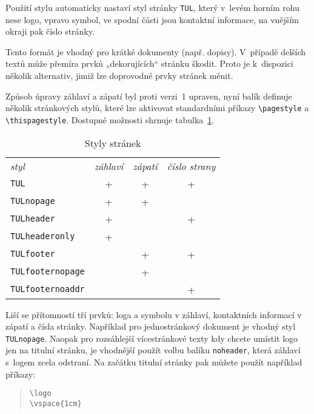 \documentclass[a4paper,12pt,twoside,FP]{article}
\newcommand{\cmdfont}[1]{\texttt{\color{\tulcolor}#1}}
\newcommand{\cmdnoindex}[1]{\cmdfont{\textbackslash #1}}
\begin{document}
Použití stylu automaticky nastaví styl stránky \cmdfont{TUL}, který v~levém
horním rohu nese logo, vpravo symbol, ve spodní části jsou kontaktní informace,
na vnějším okraji pak číslo stránky.

Tento formát je vhodný pro krátké dokumenty (např. dopisy). V~případě delších
textů může přemíra prvků „dekorujících“ stránku škodit. Proto je k~dispozici
několik alternativ, jimiž lze doprovodné prvky stránek měnit.

Způsob úpravy záhlaví a zápatí byl proti verzi~1 upraven, nyní balík definuje
několik stránkových stylů, které lze aktivovat standardními příkazy
\cmdfont{\textbackslash pagestyle} a \cmdfont{\textbackslash thispagestyle}.
Dostupné možnosti shrnuje tabulka~\ref{styly-stranek}.

\begin{table}[htp]
\begin{center}
\newcommand{\ano}{\mbox{}\qquad +\qquad\mbox{}}
\begin{tabular}{l@{}c@{}c@{}c}
\emph{styl} & \emph{záhlaví} & \emph{zápatí} & \emph{číslo strany} \\
\cmdfont{TUL}             & \ano & \ano & \ano \\
\cmdfont{TULnopage}       & \ano & \ano &   \\
\cmdfont{TULheader}       & \ano &   & \ano \\
\cmdfont{TULheaderonly}   & \ano &   &   \\
\cmdfont{TULfooter}       &   & \ano & \ano \\
\cmdfont{TULfooternopage} &   & \ano &   \\
\cmdfont{TULfooternoaddr} &   &   & \ano \\
\end{tabular}
\end{center}
\caption{Styly stránek}
\label{styly-stranek}
\end{table}

Liší se přítomností tří prvků: loga a symbolu v záhlaví, kontaktních informací
v zápatí a čísla stránky. Například pro jednostránkový dokument je vhodný styl
\cmdfont{TULnopage}. Naopak pro rozsáhlejší vícestránkové texty kdy chcete
umístit logo jen na titulní stránku, je vhodnější použít volbu balíku
\cmdfont{noheader}, která záhlaví s~logem zcela odstraní. Na začátku titulní
stránky pak můžete použít například příkazy:

\begin{quote}
\cmdnoindex{logo}\\
\cmdnoindex{vspace\{1cm\}}
\end{quote}
\end{document}

